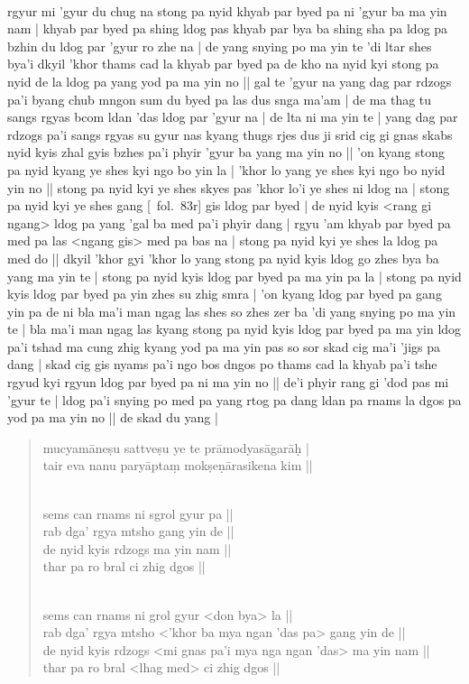 \documentclass[12pt]{article}
\begin{document}
\textbf{\TVB}\\
rgyur mi 'gyur du chug na stong pa nyid khyab par byed pa ni 'gyur ba ma yin nam | khyab par byed pa shing ldog pas khyab par bya ba shing sha pa ldog pa bzhin du ldog par 'gyur ro zhe na | de yang snying po ma yin te 'di ltar shes bya'i dkyil 'khor thams cad la khyab par byed pa de kho na nyid kyi stong pa nyid de la ldog pa yang yod pa ma yin no || gal te 'gyur na yang dag par rdzogs pa'i byang chub mngon sum du byed pa las dus snga ma'am | de ma thag tu sangs rgyas bcom ldan 'das ldog par 'gyur na | de lta ni ma yin te | yang dag par rdzogs pa'i sangs rgyas su gyur nas kyang thugs rjes dus ji srid cig gi gnas skabs nyid kyis zhal gyis bzhes pa'i phyir 'gyur ba yang ma yin no || 'on kyang stong pa nyid kyang ye shes kyi ngo bo yin la | 'khor lo yang ye shes kyi ngo bo nyid yin no || stong pa nyid kyi ye shes skyes pas 'khor lo'i ye shes ni ldog na | stong pa nyid kyi ye shes gang [\TVB\ fol.\ 83r] gis ldog par byed | de nyid kyis <rang gi ngang> ldog pa yang 'gal ba med pa'i phyir dang | rgyu 'am khyab par byed pa med pa las <ngang gis> med pa bas na | stong pa nyid kyi ye shes la ldog pa med do || dkyil 'khor gyi 'khor lo yang stong pa nyid kyis ldog go zhes bya ba yang ma yin te | stong pa nyid kyis ldog par byed pa ma yin pa la | stong pa nyid kyis ldog par byed pa yin zhes su zhig smra | 'on kyang ldog par byed pa gang yin pa de ni bla ma'i man ngag las shes so zhes zer ba 'di yang snying po ma yin te | bla ma'i man ngag las kyang stong pa nyid kyis ldog par byed pa ma yin ldog pa'i tshad ma cung zhig kyang yod pa ma yin pas so sor skad cig ma'i 'jigs pa dang | skad cig gis nyams pa'i ngo bos dngos po thams cad la khyab pa'i tshe rgyud kyi rgyun ldog par byed pa ni ma yin no || de'i phyir rang gi 'dod pas mi 'gyur te | ldog pa'i snying po med pa yang rtog pa dang ldan pa rnams la dgos pa yod pa ma yin no || de skad du yang |

\begin{quote}
	mucyamāneṣu sattveṣu ye te prāmodyasāgarāḥ | \\
	tair eva nanu paryāptaṃ mokṣeṇārasikena kim ||

	\textbf{\TVA}\\
	sems can rnams ni sgrol gyur pa || \\
	rab dga' rgya mtsho gang yin de || \\
	de nyid kyis rdzogs ma yin nam || \\
	thar pa ro bral ci zhig dgos || 

	\textbf{\TVB}\\
	sems can rnams ni grol gyur <don bya> la || \\
	rab dga' rgya mtsho <'khor ba mya ngan 'das pa> gang yin de || \\
	de nyid kyis rdzogs <mi gnas pa'i mya nga ngan 'das> ma yin nam || \\
	thar pa ro bral <lhag med> ci zhig dgos || 
\end{quote}
\end{document}
